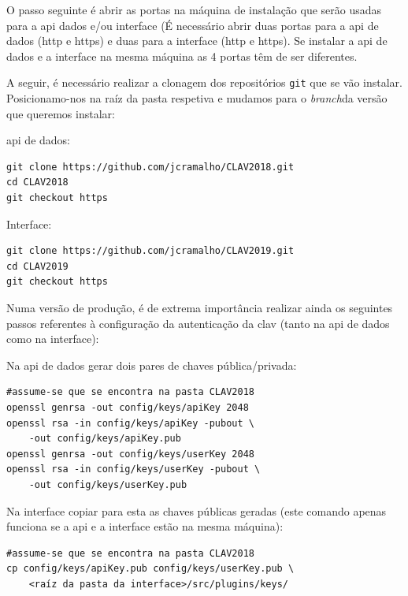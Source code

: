 O passo seguinte é abrir as portas na máquina de instalação que serão usadas para a \acrshort{api} dados e/ou interface (É necessário abrir duas portas para a \acrshort{api} de dados (\acrshort{http} e \acrshort{https}) e duas para a interface (\acrshort{http} e \acrshort{https}). Se instalar a \acrshort{api} de dados e a interface na mesma máquina as 4 portas têm de ser diferentes.

A seguir, é necessário realizar a clonagem dos repositórios \texttt{git} que se vão instalar. Posicionamo-nos na raíz da pasta respetiva e mudamos para o \textit{branch}da versão que queremos  instalar:

\footnotesize
\begin{center}
\begin{minipage}{0.49\textwidth}
\acrshort{api} de dados:
\begin{verbatim}
git clone https://github.com/jcramalho/CLAV2018.git
cd CLAV2018
git checkout https
\end{verbatim}
\end{minipage}%
\begin{minipage}{0.49\textwidth}
Interface:
\begin{verbatim}
git clone https://github.com/jcramalho/CLAV2019.git
cd CLAV2019
git checkout https
\end{verbatim}
\end{minipage}
\end{center}
\normalsize

Numa versão de produção, é de extrema importância realizar ainda os seguintes passos referentes à configuração da autenticação da \acrshort{clav} (tanto na \acrshort{api} de dados como na interface):

\footnotesize
\begin{center}
\begin{minipage}[t]{0.49\textwidth}
Na \acrshort{api} de dados gerar dois pares de chaves pública/privada:
\begin{verbatim}
#assume-se que se encontra na pasta CLAV2018 
openssl genrsa -out config/keys/apiKey 2048
openssl rsa -in config/keys/apiKey -pubout \
    -out config/keys/apiKey.pub
openssl genrsa -out config/keys/userKey 2048
openssl rsa -in config/keys/userKey -pubout \
    -out config/keys/userKey.pub
\end{verbatim}
\end{minipage}%
\begin{minipage}[t]{0.49\textwidth}
Na interface copiar para esta as chaves públicas geradas (este comando apenas funciona se a \acrshort{api} e a interface estão na mesma máquina):
\begin{verbatim}
#assume-se que se encontra na pasta CLAV2018 
cp config/keys/apiKey.pub config/keys/userKey.pub \
    <raíz da pasta da interface>/src/plugins/keys/
\end{verbatim}
\end{minipage}
\end{center}
\normalsize

